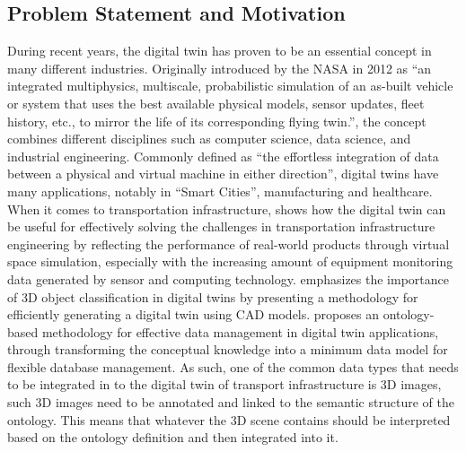 \documentclass[a4paper,11pt,oneside]{article}
\begin{document}
  \subsection{Problem Statement and Motivation}
  During recent years, the digital twin has proven to be an essential concept in many different industries. Originally introduced by the NASA in 2012 as “an integrated multiphysics, multiscale, probabilistic simulation of an as-built vehicle or system that uses the best available physical models, sensor updates, fleet history, etc., to mirror the life of its corresponding flying twin.”\cite{Glaessgen2012TheDT}, the concept combines different disciplines such as computer science, data science, and industrial engineering. Commonly defined as “the effortless integration of data between a physical and virtual machine in either direction”\cite{9103025}, digital twins have many applications, notably in “Smart Cities”, manufacturing and healthcare. When it comes to transportation infrastructure, \cite{9540108} shows how the digital twin can be useful for effectively solving the challenges in transportation infrastructure engineering by reflecting the performance of real-world products through virtual space simulation, especially with the increasing amount of equipment monitoring data generated by sensor and computing technology. \cite{objectdetectionDT} emphasizes the importance of 3D object classification in digital twins by presenting a methodology for efficiently generating a digital twin using CAD models. \cite{DTOnto} proposes an ontology-based methodology for effective data management in digital twin applications, through transforming the conceptual knowledge into a minimum data model for flexible database management. As such, one of the common data types that needs to be integrated in to the digital twin of transport infrastructure is 3D images, such 3D images need to be annotated and linked to the semantic structure of the ontology. This means that whatever the 3D scene contains should be interpreted based on the ontology definition and then integrated into it. 
\end{document}
